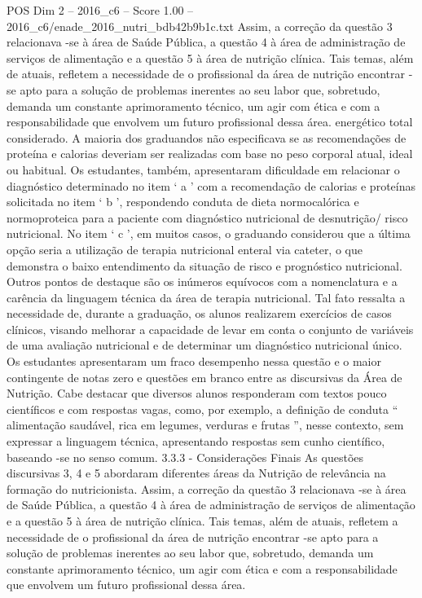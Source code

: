 \begin{textsample}{POS Dim 2 – 2016\_c6 – Score 1.00 – 2016\_c6/enade\_2016\_nutri\_bdb42b9b1c.txt}
Assim, a correção da questão 3 relacionava -se à área de Saúde Pública, a questão 4 à área de administração de serviços de alimentação e a questão 5 à área de nutrição clínica.
Tais temas, além de atuais, refletem a necessidade de o profissional da área de nutrição encontrar -se apto para a solução de problemas inerentes ao seu labor que, sobretudo, demanda um constante aprimoramento técnico, um agir com ética e com a responsabilidade que envolvem um futuro profissional dessa área. energético total considerado.
A maioria dos graduandos não especificava se as recomendações de proteína e calorias deveriam ser realizadas com base no peso corporal atual, ideal ou habitual.
Os estudantes, também, apresentaram dificuldade em relacionar o diagnóstico determinado no item ‘ a ’ com a recomendação de calorias e proteínas solicitada no item ‘ b ’, respondendo conduta de dieta normocalórica e normoproteica para a paciente com diagnóstico nutricional de desnutrição/ risco nutricional.
No item ‘ c ’, em muitos casos, o graduando considerou que a última opção seria a utilização de terapia nutricional enteral via cateter, o que demonstra o baixo entendimento da situação de risco e prognóstico nutricional.
Outros pontos de destaque são os inúmeros equívocos com a nomenclatura e a carência da linguagem técnica da área de terapia nutricional.
Tal fato ressalta a necessidade de, durante a graduação, os alunos realizarem exercícios de casos clínicos, visando melhorar a capacidade de levar em conta o conjunto de variáveis de uma avaliação nutricional e de determinar um diagnóstico nutricional único.
Os estudantes apresentaram um fraco desempenho nessa questão e o maior contingente de notas zero e questões em branco entre as discursivas da Área de Nutrição.
Cabe destacar que diversos alunos responderam com textos pouco científicos e com respostas vagas, como, por exemplo, a definição de conduta “ alimentação saudável, rica em legumes, verduras e frutas ”, nesse contexto, sem expressar a linguagem técnica, apresentando respostas sem cunho científico, baseando -se no senso comum. 3.3.3 - Considerações Finais As questões discursivas 3, 4 e 5 abordaram diferentes áreas da Nutrição de relevância na formação do nutricionista.
Assim, a correção da questão 3 relacionava -se à área de Saúde Pública, a questão 4 à área de administração de serviços de alimentação e a questão 5 à área de nutrição clínica.
Tais temas, além de atuais, refletem a necessidade de o profissional da área de nutrição encontrar -se apto para a solução de problemas inerentes ao seu labor que, sobretudo, demanda um constante aprimoramento técnico, um agir com ética e com a responsabilidade que envolvem um futuro profissional dessa área.

\end{textsample}
